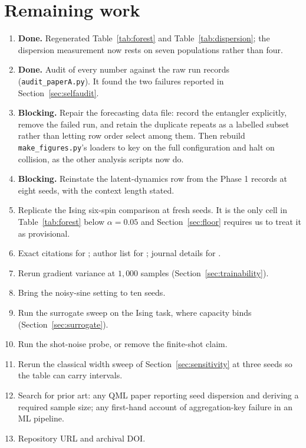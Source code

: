 \documentclass[11pt,onecolumn]{article}
\begin{document}
\section{Remaining work}\label{app:remaining}
\begin{enumerate}\itemsep3pt
\item \textbf{Done.} Regenerated Table~\ref{tab:forest} and
      Table~\ref{tab:dispersion}; the dispersion measurement now rests
      on seven populations rather than four.
\item \textbf{Done.} Audit of every number against the raw run records
      (\texttt{audit\_paperA.py}). It found the two failures reported in
      Section~\ref{sec:selfaudit}.
\item \textbf{Blocking.} Repair the forecasting data file: record the
      entangler explicitly, remove the failed run, and retain the
      duplicate repeats as a labelled subset rather than letting row
      order select among them. Then rebuild
      \texttt{make\_figures.py}'s loaders to key on the full
      configuration and halt on collision, as the other analysis scripts
      now do.
\item \textbf{Blocking.} Reinstate the latent-dynamics row from the
      Phase 1 records at eight seeds, with the context length stated.
\item Replicate the Ising six-spin comparison at fresh seeds. It is the
      only cell in Table~\ref{tab:forest} below $\alpha = 0.05$ and
      Section~\ref{sec:floor} requires us to treat it as provisional.
\item Exact citations for
      \cite{henderson2018,agarwal2021,bouthillier2021,dodge2019,pandey2026};
      author list for \cite{qasa}; journal details for
      \cite{schuld2021}.
\item Rerun gradient variance at $1{,}000$ samples
      (Section~\ref{sec:trainability}).
\item Bring the noisy-sine setting to ten seeds.
\item Run the surrogate sweep on the Ising task, where capacity binds
      (Section~\ref{sec:surrogate}).
\item Run the shot-noise probe, or remove the finite-shot claim.
\item Rerun the classical width sweep of
      Section~\ref{sec:sensitivity} at three seeds so the table can
      carry intervals.
\item Search for prior art: any QML paper reporting seed dispersion and
      deriving a required sample size; any first-hand account of
      aggregation-key failure in an ML pipeline.
\item Repository URL and archival DOI.
\end{enumerate}
\end{document}
